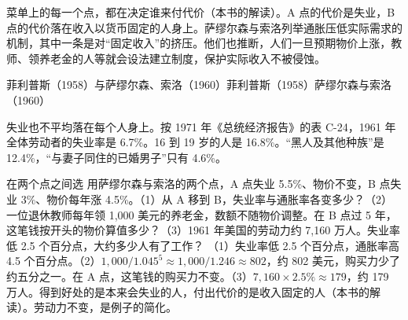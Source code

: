 菜单上的每一个点，都在决定谁来付代价（本书的解读）。A 点的代价是失业，B 点的代价落在收入以货币固定的人身上。萨缪尔森与索洛列举通胀压低实际需求的机制，其中一条是对“固定收入”的挤压\cite{samuelson1960}。他们也推断，人们一旦预期物价上涨，教师、领养老金的人等就会设法建立制度，保护实际收入不被侵蚀\cite{samuelson1960}。

\begin{compare}{菲利普斯（1958）与萨缪尔森、索洛（1960）}{菲利普斯（1958）}{萨缪尔森与索洛（1960）}
\end{compare}

失业也不平均落在每个人身上。按 1971 年《总统经济报告》的表 C-24，1961 年全体劳动者的失业率是 6.7\%\cite{erp1971}。16 到 19 岁的人是 16.8\%\cite{erp1971}。“黑人及其他种族”是 12.4\%，“与妻子同住的已婚男子”只有 4.6\%\cite{erp1971}。

\begin{example}{在两个点之间选}\label{ex:phillips-menu}
用萨缪尔森与索洛的两个点，A 点失业 5.5\%、物价不变，B 点失业 3\%、物价每年涨 4.5\%\cite{samuelson1960}。（1）从 A 移到 B，失业率与通胀率各变多少？（2）一位退休教师每年领 1,000 美元的养老金，数额不随物价调整。在 B 点过 5 年，这笔钱按开头的物价算值多少？（3）1961 年美国的劳动力约 7,160 万人\cite{erp1962}。失业率低 2.5 个百分点，大约多少人有了工作？
\solution
（1）失业率低 2.5 个百分点，通胀率高 4.5 个百分点。（2）$1{,}000/1.045^{5}\approx1{,}000/1.246\approx802$，约 802 美元，购买力少了约五分之一。在 A 点，这笔钱的购买力不变。（3）$7{,}160\times2.5\%\approx179$，约 179 万人。得到好处的是本来会失业的人，付出代价的是收入固定的人（本书的解读）。劳动力不变，是例子的简化。
\end{example}


